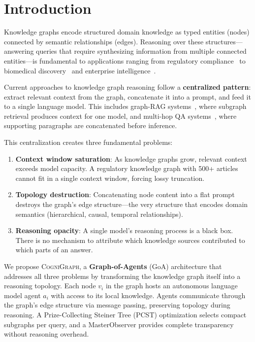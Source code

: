\documentclass[a4paper,11pt]{article}
\theoremstyle{definition}
\newcommand{\cogni}{\textsc{CogniGraph}}
\begin{document}
\vspace{3mm}

\section{Introduction}
\label{sec:intro}

Knowledge graphs encode structured domain knowledge as typed entities (nodes) connected by semantic relationships (edges).
Reasoning over these structures---answering queries that require synthesizing information from multiple connected entities---is fundamental to applications ranging from regulatory compliance~\cite{tamrplus2026} to biomedical discovery~\cite{biokg2023} and enterprise intelligence~\cite{enterprisekg2024}.

Current approaches to knowledge graph reasoning follow a \textbf{centralized pattern}: extract relevant context from the graph, concatenate it into a prompt, and feed it to a single language model.
This includes graph-RAG systems~\cite{graphrag2024}, where subgraph retrieval produces context for one model, and multi-hop QA systems~\cite{hotpotqa2018}, where supporting paragraphs are concatenated before inference.

This centralization creates three fundamental problems:

\begin{enumerate}
\item \textbf{Context window saturation}: As knowledge graphs grow, relevant context exceeds model capacity. A regulatory knowledge graph with 500+ articles cannot fit in a single context window, forcing lossy truncation.
\item \textbf{Topology destruction}: Concatenating node content into a flat prompt destroys the graph's edge structure---the very structure that encodes domain semantics (hierarchical, causal, temporal relationships).
\item \textbf{Reasoning opacity}: A single model's reasoning process is a black box. There is no mechanism to attribute which knowledge sources contributed to which parts of an answer.
\end{enumerate}

We propose \cogni{}, a \textbf{Graph-of-Agents} (GoA) architecture that addresses all three problems by transforming the knowledge graph itself into a reasoning topology.
Each node $v_i$ in the graph hosts an autonomous language model agent $a_i$ with access to its local knowledge.
Agents communicate through the graph's edge structure via message passing, preserving topology during reasoning.
A Prize-Collecting Steiner Tree (PCST) optimization selects compact subgraphs per query, and a MasterObserver provides complete transparency without reasoning overhead.
\end{document}

